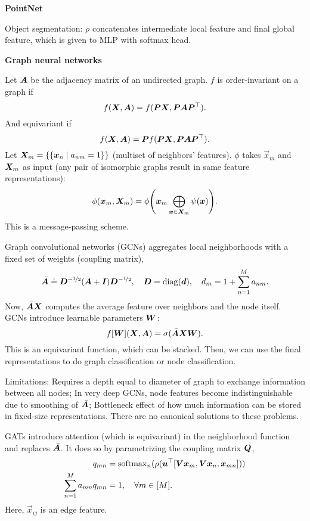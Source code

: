 \documentclass[10pt]{article}
\newenvironment{topic}[1]
{\textbf{\sffamily \colorbox{black}{\rlap{\textbf{\textcolor{white}{#1}}}\hspace{\linewidth}\hspace{-2\fboxsep}}}}
{}
\newenvironment{subtopic}[1]
{\begin{center}\textbf{\sffamily #1}\end{center}}
{}
\begin{document}
\begin{multicols*}{3}
\begin{topic}{Geometric deep learning}
\begin{subtopic}{PointNet}
            Object segmentation: $\rho$ concatenates intermediate local feature and final global feature, which
            is given to MLP with softmax head.
        \end{subtopic}

        \begin{subtopic}{Graph neural networks}
            Let $\bm{A}$ be the adjacency matrix of an undirected graph. $f$ is order-invariant on a graph if \[
                f(\bm{X},\bm{A}) = f(\bm{P}\bm{X}, \bm{P}\bm{A}\bm{P}^\top).
            \]
            And equivariant if \[
                f(\bm{X}, \bm{A}) = \bm{P} f(\bm{P}\bm{X},\bm{P}\bm{A}\bm{P}^\top).
            \]
            Let $\bm{X}_m = \{ \{ \bm{x}_n \mid a_{nm} = 1 \} \}$ (multiset of neighbors' features). $\phi$
            takes $\vec{x}_m$ and $\bm{X}_m$ as input (any pair of isomorphic graphs result in same feature
            representations): \[
                \phi(\vec{x}_m, \mat{X}_m) = \phi \lft( \vec{x}_m \bigoplus_{\vec{x} \in \mat{X}_m} \psi(\vec{x}) \rgt).
            \]
            This is a message-passing scheme.

            Graph convolutional networks (GCNs) aggregates local neighborhoods with a fixed set of weights
            (coupling matrix), \[
                \bar{\bm{A}} \doteq \bm{D}^{-\nicefrac{1}{2}} (\bm{A} + \bm{I}) \bm{D}^{-\nicefrac{1}{2}}, \quad \bm{D} = \mathrm{diag}(\bm{d}), \quad d_m = 1 + \sum_{n=1}^{M} a_{nm}.
            \]
            Now, $\bar{\bm{A}}\bm{X}$ computes the average feature over neighbors and the node itself. GCNs
            introduce learnable parameters $\bm{W}$: \[
                f[\bm{W}](\bm{X}, \bm{A}) = \sigma(\bar{\bm{A}} \bm{X} \bm{W}).
            \]
            This is an equivariant function, which can be stacked. Then, we can use the final representations
            to do graph classification or node classification.

            Limitations: Requires a depth equal to diameter of graph to exchange information between all nodes;
            In very deep GCNs, node features become indistinguishable due to smoothing of $\bar{\bm{A}}$;
            Bottleneck effect of how much information can be stored in fixed-size representations. There are no
            canonical solutions to these problems.

            GATs introduce attention (which is equivariant) in the neighborhood function and replaces
            $\bar{\bm{A}}$. It does so by parametrizing the coupling matrix $\bm{Q}$,
            \begin{align*}
                q_{mn}                       & = \mathrm{softmax}_n ( \rho(\bm{u}^\top [\bm{V}\bm{x}_m, \bm{V}\bm{x}_n, \bm{x}_{mn}]) ) \\
                \sum_{n=1}^{M} a_{mn} q_{mn} & = 1, \quad \forall m \in [M].
            \end{align*}
            Here, $\vec{x}_{ij}$ is an edge feature.


\end{subtopic}
\end{topic}
\end{multicols*}
\end{document}
